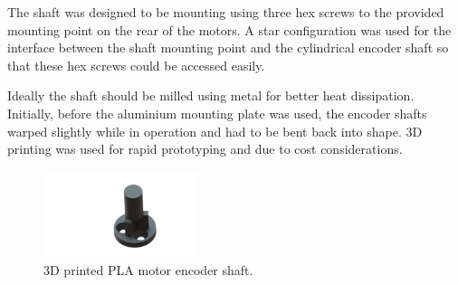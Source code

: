 The shaft was designed to be mounting using three hex screws to the provided mounting point on the rear of the motors. A star configuration was used for the interface between the shaft mounting point and the cylindrical encoder shaft so that these hex screws could be accessed easily.

Ideally the shaft should be milled using metal for better heat dissipation. Initially, before the aluminium mounting plate was used, the encoder shafts warped slightly while in operation and had to be bent back into shape. 3D printing was used for rapid prototyping and due to cost considerations.

\begin{figure}
\centering
\includegraphics[clip, trim = 6cm 1cm 3cm 1cm, width=0.4\textwidth]{images/mechanical/encoder-shaft} 
\caption{3D printed PLA motor encoder shaft.}
\label{fig:encoder-shaft}
\end{figure} 
